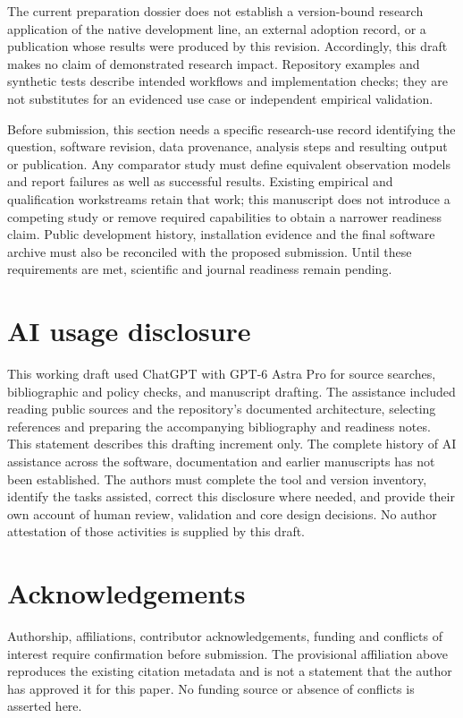 \documentclass[10pt,a4paper,onecolumn]{article}
\begin{document}
The current preparation dossier does not establish a version-bound
research application of the native development line, an external
adoption record, or a publication whose results were produced by this
revision. Accordingly, this draft makes no claim of demonstrated
research impact. Repository examples and synthetic tests describe
intended workflows and implementation checks; they are not substitutes
for an evidenced use case or independent empirical validation.

Before submission, this section needs a specific research-use record
identifying the question, software revision, data provenance, analysis
steps and resulting output or publication. Any comparator study must
define equivalent observation models and report failures as well as
successful results. Existing empirical and qualification workstreams
retain that work; this manuscript does not introduce a competing study
or remove required capabilities to obtain a narrower readiness claim.
Public development history, installation evidence and the final software
archive must also be reconciled with the proposed submission. Until
these requirements are met, scientific and journal readiness remain
pending.

\section{AI usage disclosure}\label{ai-usage-disclosure}

This working draft used ChatGPT with GPT-6 Astra Pro for source
searches, bibliographic and policy checks, and manuscript drafting. The
assistance included reading public sources and the repository's
documented architecture, selecting references and preparing the
accompanying bibliography and readiness notes. This statement describes
this drafting increment only. The complete history of AI assistance
across the software, documentation and earlier manuscripts has not been
established. The authors must complete the tool and version inventory,
identify the tasks assisted, correct this disclosure where needed, and
provide their own account of human review, validation and core design
decisions. No author attestation of those activities is supplied by this
draft.

\section{Acknowledgements}\label{acknowledgements}

Authorship, affiliations, contributor acknowledgements, funding and
conflicts of interest require confirmation before submission. The
provisional affiliation above reproduces the existing citation metadata
and is not a statement that the author has approved it for this paper.
No funding source or absence of conflicts is asserted here.
\end{document}
